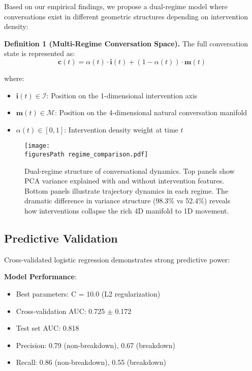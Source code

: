 \documentclass[11pt,letterpaper]{article}
\newcommand{\allFeaturesPCOne}{98.3\%}  %
\newcommand{\nonInterventionPCOneVariance}{52.4\%}  %
\newcommand{\bestRegularizationC}{10.0}
\newcommand{\cvAUCMean}{0.725}
\newcommand{\cvAUCStd}{0.172}
\newcommand{\testAUC}{0.818}
\newcommand{\precisionNonBreakdown}{0.79}
\newcommand{\precisionBreakdown}{0.67}
\newcommand{\recallNonBreakdown}{0.86}
\newcommand{\recallBreakdown}{0.55}
\newcommand{\figuresPath}{../analysis/analysis_outputs_n110/figures/}
\begin{document}
Based on our empirical findings, we propose a dual-regime model where conversations exist in different geometric structures depending on intervention density:

\textbf{Definition 1 (Multi-Regime Conversation Space).} The full conversation state is represented as:
\begin{equation}
\mathbf{c}(t) = \alpha(t) \cdot \mathbf{i}(t) + (1-\alpha(t)) \cdot \mathbf{m}(t)
\end{equation}

where:
\begin{itemize}
    \item $\mathbf{i}(t) \in \mathcal{I}$: Position on the 1-dimensional intervention axis
    \item $\mathbf{m}(t) \in \mathcal{M}$: Position on the 4-dimensional natural conversation manifold
    \item $\alpha(t) \in [0,1]$: Intervention density weight at time $t$
\end{itemize}

\begin{figure}[htbp]
\centering
\texttt{[image: \\figuresPath regime\_comparison.pdf]}
\caption{Dual-regime structure of conversational dynamics. Top panels show PCA variance explained with and without intervention features. Bottom panels illustrate trajectory dynamics in each regime. The dramatic difference in variance structure (\allFeaturesPCOne{} vs \nonInterventionPCOneVariance{}) reveals how interventions collapse the rich 4D manifold to 1D movement.}
\label{fig:regime_comparison}
\end{figure}

\subsection{Predictive Validation}

Cross-validated logistic regression demonstrates strong predictive power:

\textbf{Model Performance}:
\begin{itemize}
    \item Best parameters: C = \bestRegularizationC{} (L2 regularization)
    \item Cross-validation AUC: \cvAUCMean{} $\pm$ \cvAUCStd{}
    \item Test set AUC: \testAUC{}
    \item Precision: \precisionNonBreakdown{} (non-breakdown), \precisionBreakdown{} (breakdown)
    \item Recall: \recallNonBreakdown{} (non-breakdown), \recallBreakdown{} (breakdown)
\end{itemize}
\end{document}
